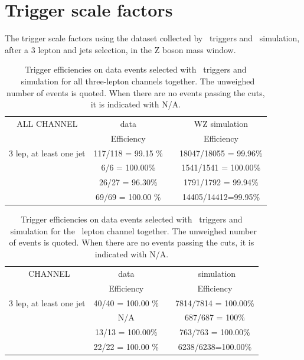 

\chapter{Trigger scale factors}
\label{app:TriggerSF}



The trigger scale factors  using the dataset collected by \Etmis\ triggers and \WZ\ simulation, after a 3 lepton and jets selection, in the Z boson mass window. 


\begin{table}[htbp]
	\centering
	\caption{Trigger efficiencies on data events selected with \Etmis\ triggers and \WZ\ simulation for all three-lepton channels together. The unweighed number of events is quoted. When there are no events passing the cuts, it is indicated with N/A. }
	\begin{tabular}{cccc}
		\toprule
		ALL CHANNEL & {data} & &{WZ simulation} \\ 
		& Efficiency &  & Efficiency  \\
		\midrule 
		3 lep,  at least one jet & 117/118 = 99.15 \% &  & 18047/18055 = 99.96\%  \\ 
		\STSR & 6/6 = 100.00\% & & 1541/1541 = 100.00\% \\ 
		\TTSR & 26/27 = 96.30\% & & 1791/1792 = 99.94\%  \\ 
		\WZCR & 69/69 = 100.00 \% &  & 14405/14412=99.95\%  \\ 
		\bottomrule 
	\end{tabular} 
\end{table}	
\begin{table}[htbp]
	\centering
	\caption{Trigger efficiencies on data events selected with \Etmis\ triggers and \WZ\ simulation for the \mumumu\ lepton channel together. The unweighed number of events is quoted. When there are no events passing the cuts, it is indicated with N/A. }
	\begin{tabular}{cccc}
		\toprule 
		\mumumu\ CHANNEL & {data} & &{\WZ\ simulation} \\
		& Efficiency &  & Efficiency  \\ 
		\midrule 
		3 lep,  at least one jet & 40/40 = 100.00 \% &  & 7814/7814 = 100.00\%   \\ 
		\STSR & N/A &  & 687/687 = 100\% \\ 
		\TTSR & 13/13 = 100.00\% &  &763/763 = 100.00\% \\ 
		\WZCR & 22/22 = 100.00 \% &  & 6238/6238=100.00\% \\ 
		\bottomrule
	\end{tabular} 
\end{table}	
